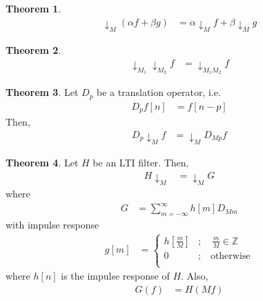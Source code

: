 \documentclass[titlepage, fleqn, a4paper, 12pt, twoside]{article}
\theoremstyle{definition}
\theoremstyle{theorem}
\newtheorem{theorem}{Theorem}
\def\downsample#1{\downarrow_{#1}}
\begin{document}
\begin{theorem}
	\begin{align*}
		\downsample{M} (\alpha f + \beta g) &= \alpha \downsample{M} f + \beta \downsample{M} g
	\end{align*}
\end{theorem}

\begin{theorem}
	\begin{align*}
		\downsample{M_1} \downsample{M_2} f &= \downsample{M_1 M_2} f
	\end{align*}
\end{theorem}

\begin{theorem}
	Let $D_p$ be a translation operator, i.e.
	\begin{align*}
		D_p f[n] &= f[n - p]
	\end{align*}
	Then,
	\begin{align*}
		D_p \downsample{M} f &= \downsample{M} D_{M p} f
	\end{align*}
\end{theorem}

\begin{theorem}
	Let $H$ be an LTI filter.
	Then,
	\begin{align*}
		H \downsample{M} &= \downsample{M} G
	\end{align*}
	where
	\begin{align*}
		G &= \sum\limits_{m = -\infty}^{\infty} h[m] D_{M m}
	\end{align*}
	with impulse response
	\begin{align*}
		g[m] &=
			\begin{cases}
				h\left[ \frac{m}{M} \right] &;\quad \frac{m}{M} \in \mathbb{Z}\\
				0 &;\quad \text{otherwise}\\
			\end{cases}
	\end{align*}
	where $h[n]$ is the impulse response of $H$.
	Also,
	\begin{align*}
		G(f) &= H(M f)
	\end{align*}
\end{theorem}
\end{document}
